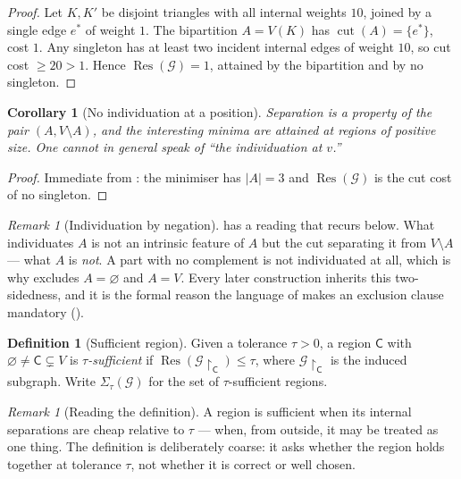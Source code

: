 \documentclass[11pt,a4paper]{article}
\theoremstyle{clstyle}
\newtheorem{corollary}[theorem]{Corollary}
\theoremstyle{definition}
\newtheorem{definition}[theorem]{Definition}
\theoremstyle{remark}
\newtheorem{remark}[theorem]{Remark}
\DeclareMathOperator{\cut}{cut}
\DeclareMathOperator{\Res}{Res}
\newcommand{\Gph}{\mathcal{G}}
\newcommand{\V}{V}
\newcommand{\Cell}{\mathsf{C}}
\newcommand{\Sig}{\Sigma}
\newcommand{\abs}[1]{\lvert#1\rvert}
\begin{document}
\begin{proof}
Let $K,K'$ be disjoint triangles with all internal weights $10$, joined by a
single edge $e^{*}$ of weight $1$. The bipartition $A=V(K)$ has
$\cut(A)=\{e^{*}\}$, cost $1$. Any singleton has at least two incident
internal edges of weight $10$, so cut cost $\ge20>1$. Hence $\Res(\Gph)=1$,
attained by the bipartition and by no singleton.
\end{proof}

\begin{corollary}[No individuation at a position]
\label{cor:no-point}
Separation is a property of the pair $(A,\V\setminus A)$, and the
interesting minima are attained at regions of positive size. One cannot in
general speak of ``the individuation at $v$.''
\end{corollary}

\begin{proof}
Immediate from : the minimiser has $\abs{A}=3$ and
$\Res(\Gph)$ is the cut cost of no singleton.
\end{proof}

\begin{remark}[Individuation by negation]
\label{rem:negation}
 has a reading that recurs below. What individuates $A$
is not an intrinsic feature of $A$ but the cut separating it from
$\V\setminus A$ --- what $A$ is \emph{not}. A part with no complement is not
individuated at all, which is why  excludes $A=\varnothing$ and
$A=\V$. Every later construction inherits this two-sidedness, and it is the
formal reason the language of  makes an exclusion clause
mandatory ().
\end{remark}

\begin{definition}[Sufficient region]
\label{def:sufficient}
Given a tolerance $\tau>0$, a region $\Cell$ with
$\varnothing\neq\Cell\subsetneq\V$ is \emph{$\tau$-sufficient} if
$\Res(\Gph\!\restriction_{\Cell})\le\tau$, where $\Gph\!\restriction_{\Cell}$
is the induced subgraph. Write $\Sig_\tau(\Gph)$ for the set of
$\tau$-sufficient regions.
\end{definition}

\begin{remark}[Reading the definition]
\label{rem:sufficient}
A region is sufficient when its internal separations are cheap relative to
$\tau$ --- when, from outside, it may be treated as one thing. The
definition is deliberately coarse: it asks whether the region holds together
at tolerance $\tau$, not whether it is correct or well chosen.
\end{remark}
\end{document}
